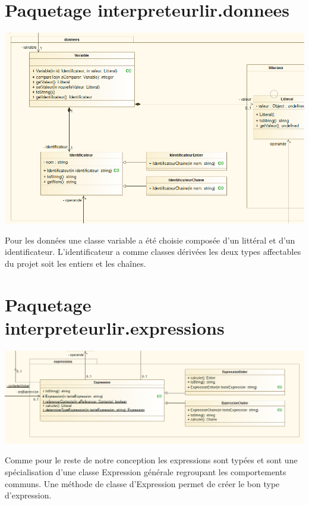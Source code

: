 \section{Paquetage interpreteurlir.donnees}
\begin{center}\includegraphics[scale=0.65]{fichiers/dossierPartieConception/img/COO/COO_prototype_1/PackageDonnees}\end{center}
\par Pour les données une classe variable a été choisie composée d'un littéral et d'un identificateur.
L'identificateur a comme classes dérivées les deux types affectables du projet soit les entiers et les chaînes.

\section{Paquetage interpreteurlir.expressions}
\begin{center}\includegraphics[scale=0.60]{fichiers/dossierPartieConception/img/COO/COO_prototype_1/PackageExpressions}\end{center}
\par Comme pour le reste de notre conception les expressions sont typées et sont une spécialisation d'une classe Expression générale regroupant les comportements communs. Une méthode de classe d'Expression permet de créer le bon type d'expression.

